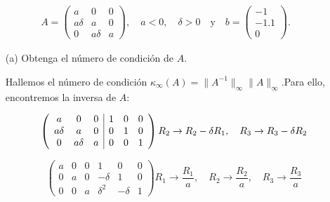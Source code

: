 \begin{homeworkProblem}
  \begin{align*}
    A =  
\begin{pmatrix}  
a & 0 & 0 \\  
a\delta & a & 0 \\  
0 & a\delta & a  
\end{pmatrix}, \quad a < 0, \quad \delta > 0
\quad\text{y}\quad  b =  
\begin{pmatrix}  
-1 \\  
-1.1 \\  
0  
\end{pmatrix}.
\end{align*}


\begin{enumerate}
    \item[(a)] Obtenga el número de condición de \( A \).
    \begin{solucion}
      Hallemos el número de condición $\kappa_\infty(A) = \|A^{-1}\|_\infty\|A\|_\infty $.Para ello,  encontremos la inversa de $A$:
        


\[
\left(
\begin{array}{ccc|ccc}
a & 0 & 0 & 1 & 0 & 0 \\
a\delta & a & 0 & 0 & 1 & 0 \\
0 & a\delta & a & 0 & 0 & 1
\end{array}
\right)
R_2 \rightarrow R_2 - \delta R_1,\\
\quad R_3 \rightarrow R_3 - \delta R_2
\]

\[
\left(
\begin{array}{ccc|ccc}
a & 0 & 0 & 1 & 0 & 0 \\
0 & a & 0 & -\delta & 1 & 0 \\
0 & 0 & a & \delta^2 & -\delta & 1
\end{array}
\right)
R_1 \rightarrow \frac{R_1}{a}, \quad R_2 \rightarrow \frac{R_2}{a}, \quad R_3 \rightarrow \frac{R_3}{a}
\]


\end{solucion}
\end{enumerate}
\end{homeworkProblem}

